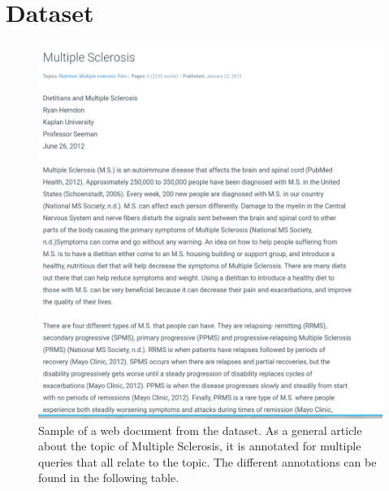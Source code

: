 \appendix
\chapter{Dataset}\label{appendix:dataset}
\begin{figure}
    \centering
    \includegraphics[width=\linewidth]{images/sample_query_multi_eval.png}
    \caption{Sample of a web document from the dataset. As a general article about the topic of Multiple Sclerosis, it is annotated for multiple queries that all relate to the topic. The different annotations can be found in the following table.}
\end{figure}
